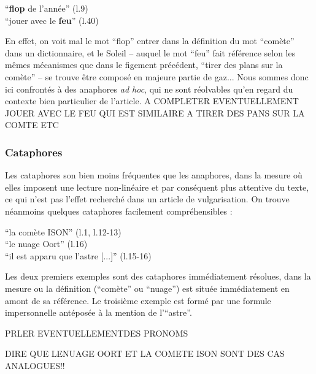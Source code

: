 \documentclass[a4paper,10pt]{article}
\begin{document}
			\begin{center}
				\footnotesize
				\begin{minipage}{0.7\textwidth}
					``\textbf{flop} de l'année'' (l.9) \\
					``jouer avec le \textbf{feu}'' (l.40) \\
				\end{minipage}
			\end{center}
			En effet, on voit mal le mot ``flop'' entrer dans la définition du mot ``comète'' dans un dictionnaire, et le Soleil -- auquel le mot ``feu'' fait référence selon les mêmes mécanismes que dans le figement précédent, ``tirer des plans sur la comète'' -- se trouve être composé en majeure partie de gaz... Nous sommes donc ici confrontés à des anaphores \textit{ad hoc}, qui ne sont réolvables qu'en regard du contexte bien particulier de l'article.
			A COMPLETER EVENTUELLEMENT JOUER AVEC LE FEU QUI EST SIMILAIRE A TIRER DES PANS SUR LA COMTE ETC
		\subsubsection{Cataphores} \label{cataphore}
			Les cataphores son bien moins fréquentes que les anaphores, dans la mesure où elles imposent une lecture non-linéaire et par conséquent plus attentive du texte, ce qui n'est pas l'effet recherché dans un article de vulgarisation. On trouve néanmoins quelques cataphores facilement compréhensibles :
			\begin{center}
				\footnotesize
				\begin{minipage}{0.7\textwidth}
					``la comète ISON'' (l.1, l.12-13) \\
					``le nuage Oort'' (l.16) \\
					``il est apparu que l'astre [...]'' (l.15-16)
				\end{minipage}
			\end{center}
			Les deux premiers exemples sont des cataphores immédiatement résolues, dans la mesure ou la définition (``comète'' ou ``nuage'') est située immédiatement en amont de sa référence. Le troisième exemple est formé par une formule impersonnelle antéposée à la mention de l'``astre''.
			
			PRLER EVENTUELLEMENTDES PRONOMS
			
			
		DIRE QUE LENUAGE OORT ET LA COMETE ISON SONT DES CAS ANALOGUES!!
\end{document}

